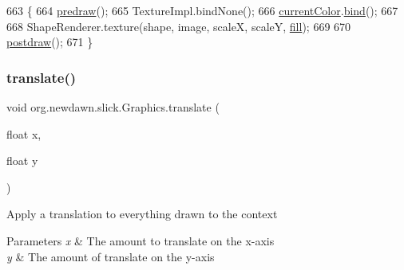 \begin{DoxyCode}
663                             \{
664         \mbox{\hyperlink{classorg_1_1newdawn_1_1slick_1_1_graphics_a7b4c203181e3b6302d51ed9b24596b8d}{predraw}}();
665         TextureImpl.bindNone();
666         \mbox{\hyperlink{classorg_1_1newdawn_1_1slick_1_1_graphics_add4b542e574390a735aad66468135d5a}{currentColor}}.\mbox{\hyperlink{classorg_1_1newdawn_1_1slick_1_1_color_ae4b71c94854f7983f2ccdb7340438e23}{bind}}();
667 
668         ShapeRenderer.texture(shape, image, scaleX, scaleY, \mbox{\hyperlink{classorg_1_1newdawn_1_1slick_1_1_graphics_a7c694d58339cd5e41270cb46aa52929c}{fill}});
669 
670         \mbox{\hyperlink{classorg_1_1newdawn_1_1slick_1_1_graphics_abe054371d1486618ff327bbbcf02ff97}{postdraw}}();
671     \}
\end{DoxyCode}
\mbox{\label{classorg_1_1newdawn_1_1slick_1_1_graphics_ad75589e65f1d524870c0b719172ba065}} 
\subsubsection{\texorpdfstring{translate()}{translate()}\hspace{0.1cm}{\footnotesize\ttfamily [1/2]}}
{\footnotesize\ttfamily void org.\+newdawn.\+slick.\+Graphics.\+translate (\begin{DoxyParamCaption}\item[{float}]{x,  }\item[{float}]{y }\end{DoxyParamCaption})\hspace{0.3cm}{\ttfamily [inline]}}

Apply a translation to everything drawn to the context


\begin{DoxyParams}{Parameters}
{\em x} & The amount to translate on the x-\/axis \\
\hline
{\em y} & The amount of translate on the y-\/axis \\
\hline
\end{DoxyParams}

